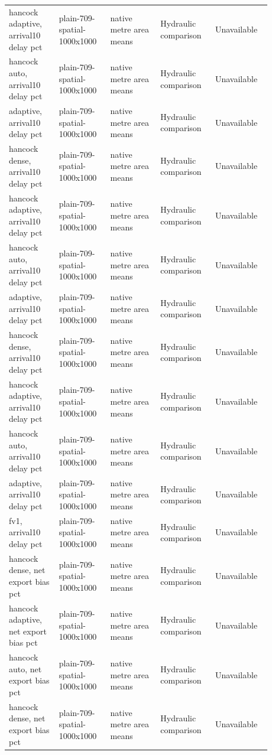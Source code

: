 \begin{longtable}{p{0.1760\linewidth}p{0.1760\linewidth}p{0.1760\linewidth}p{0.1760\linewidth}p{0.1760\linewidth}}
hancock adaptive, arrival10 delay pct & plain-709-spatial-1000x1000 & native metre area means & Hydraulic comparison & Unavailable \\
hancock auto, arrival10 delay pct & plain-709-spatial-1000x1000 & native metre area means & Hydraulic comparison & Unavailable \\
adaptive, arrival10 delay pct & plain-709-spatial-1000x1000 & native metre area means & Hydraulic comparison & Unavailable \\
hancock dense, arrival10 delay pct & plain-709-spatial-1000x1000 & native metre area means & Hydraulic comparison & Unavailable \\
hancock adaptive, arrival10 delay pct & plain-709-spatial-1000x1000 & native metre area means & Hydraulic comparison & Unavailable \\
hancock auto, arrival10 delay pct & plain-709-spatial-1000x1000 & native metre area means & Hydraulic comparison & Unavailable \\
adaptive, arrival10 delay pct & plain-709-spatial-1000x1000 & native metre area means & Hydraulic comparison & Unavailable \\
hancock dense, arrival10 delay pct & plain-709-spatial-1000x1000 & native metre area means & Hydraulic comparison & Unavailable \\
hancock adaptive, arrival10 delay pct & plain-709-spatial-1000x1000 & native metre area means & Hydraulic comparison & Unavailable \\
hancock auto, arrival10 delay pct & plain-709-spatial-1000x1000 & native metre area means & Hydraulic comparison & Unavailable \\
adaptive, arrival10 delay pct & plain-709-spatial-1000x1000 & native metre area means & Hydraulic comparison & Unavailable \\
fv1, arrival10 delay pct & plain-709-spatial-1000x1000 & native metre area means & Hydraulic comparison & Unavailable \\
hancock dense, net export bias pct & plain-709-spatial-1000x1000 & native metre area means & Hydraulic comparison & Unavailable \\
hancock adaptive, net export bias pct & plain-709-spatial-1000x1000 & native metre area means & Hydraulic comparison & Unavailable \\
hancock auto, net export bias pct & plain-709-spatial-1000x1000 & native metre area means & Hydraulic comparison & Unavailable \\
hancock dense, net export bias pct & plain-709-spatial-1000x1000 & native metre area means & Hydraulic comparison & Unavailable \\

\end{longtable}
